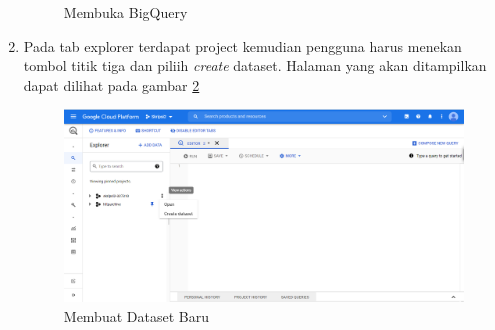 \begin{enumerate}
\begin{figure}[H]
		\caption{Membuka BigQuery} 
		\label{fig:BQ} 
	\end{figure}
	\item Pada tab explorer terdapat project kemudian pengguna harus menekan tombol titik tiga dan piliih \textit{create} dataset. Halaman yang akan ditampilkan dapat dilihat pada gambar \ref{fig:create_dataset}
	\begin{figure}[H]
		\centering  
		\includegraphics[scale=0.45]{Gambar/create_dataset.PNG}  
		\caption{Membuat Dataset Baru} 
		\label{fig:create_dataset} 
	\end{figure}
\end{enumerate}

